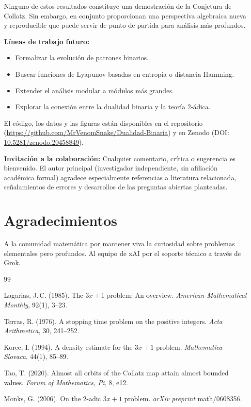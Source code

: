 \documentclass[11pt,a4paper]{article}
\begin{document}
Ninguno de estos resultados constituye una demostración de la Conjetura
de Collatz. Sin embargo, en conjunto proporcionan una perspectiva
algebraica nueva y reproducible que puede servir de punto de partida
para análisis más profundos.

\textbf{Líneas de trabajo futuro:}
\begin{itemize}[noitemsep]
  \item Formalizar la evolución de patrones binarios.
  \item Buscar funciones de Lyapunov basadas en entropía o distancia Hamming.
  \item Extender el análisis modular a módulos más grandes.
  \item Explorar la conexión entre la dualidad binaria y la teoría 2-ádica.
\end{itemize}

\medskip
\noindent
El código, los datos y las figuras están disponibles en el repositorio
(\url{https://github.com/MrVenomSnake/Dualidad-Binaria})
y en Zenodo (DOI: \href{https://doi.org/10.5281/zenodo.20458849}{10.5281/zenodo.20458849}).

\medskip
\noindent\textbf{Invitación a la colaboración:}
Cualquier comentario, crítica o sugerencia es bienvenido.
El autor principal (investigador independiente, sin afiliación
académica formal) agradece especialmente referencias a literatura
relacionada, señalamientos de errores y desarrollos de las
preguntas abiertas planteadas.

\section*{Agradecimientos}

A la comunidad matemática por mantener viva la curiosidad sobre
problemas elementales pero profundos.
Al equipo de xAI por el soporte técnico a través de Grok.

\begin{thebibliography}{99}
\setlength{\itemsep}{0.5em}

Lagarias, J.\,C. (1985).
The $3x+1$ problem: An overview.
\textit{American Mathematical Monthly}, 92(1), 3--23.

Terras, R. (1976).
A stopping time problem on the positive integers.
\textit{Acta Arithmetica}, 30, 241--252.

Korec, I. (1994).
A density estimate for the $3x+1$ problem.
\textit{Mathematica Slovaca}, 44(1), 85--89.

Tao, T. (2020).
Almost all orbits of the Collatz map attain almost bounded values.
\textit{Forum of Mathematics, Pi}, 8, e12.

Monks, G. (2006).
On the 2-adic $3x+1$ problem.
\textit{arXiv preprint} math/0608356.

\end{thebibliography}
\end{document}

